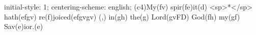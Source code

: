 initial-style: 1;
centering-scheme: english;
(c4)My(fv) spir(fe)it(d) <sp>*</sp> hath(efgv) re(f)joiced(efgvgv) (,) in(gh) the(g) Lord(gvFD) God(fh) my(gf) Sav(e)ior.(e)
